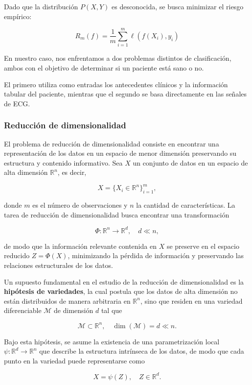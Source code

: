 \documentclass[titlepage,a4paper]{article}
\begin{document}
Dado que la distribución \( P(X,Y) \) es desconocida, se busca minimizar el riesgo empírico:

\[
R_m(f) = \frac{1}{m} \sum_{i=1}^{m} \ell(f(X_i), y_i)
\]

En nuestro caso, nos enfrentamos a dos problemas distintos de clasificación, ambos con el objetivo de determinar si un paciente está sano o no.  

El primero utiliza como entradas los antecedentes clínicos y la información tabular del paciente, mientras que el segundo se basa directamente en las señales de ECG.  

\subsubsection{Reducción de dimensionalidad}
El problema de reducción de dimensionalidad consiste en encontrar una representación de los datos en un espacio de menor dimensión preservando su estructura y contenido informativo. Sea \( X \) un conjunto de datos en un espacio de alta dimensión \( \mathbb{R}^n \), es decir,

\[
X = \{X_i \in \mathbb{R}^n\}_{i=1}^{m},
\]

donde \( m \) es el número de observaciones y \( n \) la cantidad de características. La tarea de reducción de dimensionalidad busca encontrar una transformación

\[
\Phi: \mathbb{R}^n \to \mathbb{R}^d, \quad d \ll n,
\]

de modo que la información relevante contenida en \( X \) se preserve en el espacio reducido \( Z = \Phi(X) \), minimizando la pérdida de información y preservando las relaciones estructurales de los datos.



Un supuesto fundamental en el estudio de la reducción de dimensionalidad es la \textbf{hipótesis de variedades}, la cual postula que los datos de alta dimensión no están distribuidos de manera arbitraria en \( \mathbb{R}^n \), sino que residen en una variedad diferenciable \( \mathcal{M} \) de dimensión \( d \) tal que

\[
\mathcal{M} \subset \mathbb{R}^n, \quad \dim(\mathcal{M}) = d \ll n.
\]

Bajo esta hipótesis, se asume la existencia de una parametrización local \( \psi: \mathbb{R}^d \to \mathbb{R}^n \) que describe la estructura intrínseca de los datos, de modo que cada punto en la variedad puede representarse como

\[
X = \psi(Z), \quad Z \in \mathbb{R}^d.
\]
\end{document}
